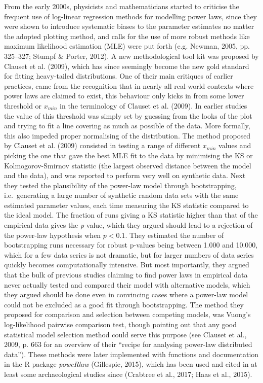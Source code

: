 \documentclass[
  12pt,
]{book}
\begin{document}
From the early 2000s, physicists and mathematicians started to criticise the frequent use of log-linear regression methods for modelling power laws, since they were shown to introduce systematic biases to the parameter estimates no matter the adopted plotting method, and calls for the use of more robust methods like maximum likelihood estimation (MLE) were put forth (e.g. Newman, 2005, pp. 325--327; Stumpf \& Porter, 2012). A new methodological tool kit was proposed by Clauset et al. (2009), which has since seemingly become the new gold standard for fitting heavy-tailed distributions. One of their main critiques of earlier practices, came from the recognition that in nearly all real-world contexts where power laws are claimed to exist, this behaviour only kicks in from some lower threshold or \(x_{min}\) in the terminology of Clauset et al. (2009). In earlier studies the value of this threshold was simply set by guessing from the looks of the plot and trying to fit a line covering as much as possible of the data. More formally, this also impeded proper normalising of the distribution. The method proposed by Clauset et al. (2009) consisted in testing a range of different \(x_{min}\) values and picking the one that gave the best MLE fit to the data by minimising the KS or Kolmogorov-Smirnov statistic (the largest observed distance between the model and the data), and was reported to perform very well on synthetic data. Next they tested the plausibility of the power-law model through bootstrapping, i.e.~generating a large number of synthetic random data sets with the same estimated parameter values, each time measuring the KS statistic compared to the ideal model. The fraction of runs giving a KS statistic higher than that of the empirical data gives the \emph{p}-value, which they argued should lead to a rejection of the power-law hypothesis when \(p < 0.1\). They estimated the number of bootstrapping runs necessary for robust p-values being between 1.000 and 10.000, which for a few data series is not dramatic, but for larger numbers of data series quickly becomes computationally intensive. But most importantly, they argued that the bulk of previous studies claiming to find power laws in empirical data never actually tested and compared their model with alternative models, which they argued should be done even in convincing cases where a power-law model could not be excluded as a good fit through bootstrapping. The method they proposed for comparison and selection between competing models, was Vuong's log-likelihood pairwise comparison test, though pointing out that any good statistical model selection method could serve this purpose (see Clauset et al., 2009, p. 663 for an overview of their ``recipe for analysing power-law distributed data''). These methods were later implemented with functions and documentation in the R package \emph{poweRlaw} (Gillespie, 2015), which has been used and cited in at least some archaeological studies since (Crabtree et al., 2017; Haas et al., 2015).
\end{document}
